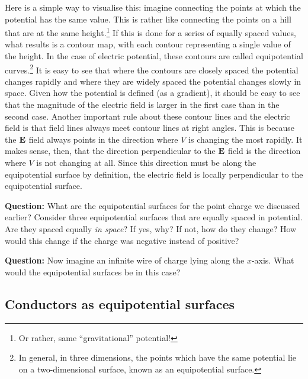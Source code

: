 Here is a simple way to visualise this: imagine connecting the points at which the potential has the same value. This is rather like connecting the points on a hill that are at the same height.\footnote{Or rather, same ``gravitational'' potential!} If this is done for a series of equally spaced values, what results is a contour map, with each contour representing a single value of the height. In the case of electric potential, these contours are called equipotential curves.\footnote{In general, in three dimensions, the points which have the same potential lie on a two-dimensional surface, known as an equipotential surface.} It is easy to see that where the contours are closely spaced the potential changes rapidly and where they are widely spaced the potential changes slowly in space. Given how the potential is defined (as a gradient), it should be easy to see that the magnitude of the electric field is larger in the first case than in the second case. Another important rule about these contour lines and the electric field is that field lines always meet contour lines at right angles. This is because the $\vb{E}$ field always points in the direction where $V$ is changing the most rapidly. It makes sense, then, that the direction perpendicular to the $\vb{E}$ field is the direction where $V$ is not changing at all. Since this direction must be along the equipotential surface by definition, the electric field is locally perpendicular to the equipotential surface.

\begin{question}
\textbf{Question:} What are the equipotential surfaces for the point charge we discussed earlier? Consider three equipotential surfaces that are equally spaced in potential. Are they spaced equally \textsl{in space}? If yes, why? If not, how do they change? How would this change if the charge was negative instead of positive?

\textbf{Question:} Now imagine an infinite wire of charge lying along the $x$-axis. What would the equipotential surfaces be in this case?
\end{question}

\subsection*{Conductors as equipotential surfaces}

